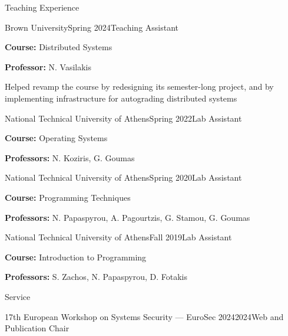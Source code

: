 \documentclass[letterpaper, 12pt]{resume}
\begin{document}
\begin{rSection}{Teaching Experience}
    \begin{rSubsection}{Brown University}{Spring 2024}{Teaching Assistant}{}
        \item \textbf{Course:} Distributed Systems
        \item \textbf{Professor:} N. Vasilakis
        \item Helped revamp the course by redesigning its semester-long project, and by implementing infrastructure for autograding distributed systems
    \end{rSubsection}

    \begin{rSubsection}{National Technical University of Athens}{Spring 2022}{Lab Assistant}{}
        \item \textbf{Course:} Operating Systems
        \item \textbf{Professors:} N. Koziris, G. Goumas
    \end{rSubsection}

    \begin{rSubsection}{National Technical University of Athens}{Spring 2020}{Lab Assistant}{}
        \item \textbf{Course:} Programming Techniques
        \item \textbf{Professors:} N. Papaspyrou, A. Pagourtzis, G. Stamou, G. Goumas
    \end{rSubsection}

    \begin{rSubsection}{National Technical University of Athens}{Fall 2019}{Lab Assistant}{}
        \item \textbf{Course:} Introduction to Programming
        \item \textbf{Professors:} S. Zachos, N. Papaspyrou, D. Fotakis
    \end{rSubsection}
\end{rSection}



\begin{rSection}{Service}
    \begin{rSubsection}{17th European Workshop on Systems Security --- EuroSec 2024}{2024}{Web and Publication Chair}{}
        \item[]
    \end{rSubsection}
    \vspace{-4ex}
\end{rSection}
\end{document}
